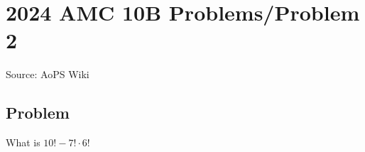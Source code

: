 \documentclass[12pt]{article}
\begin{document}
\section*{{2024 AMC 10B Problems/Problem 2}}
Source: AoPS Wiki

\subsection*{Problem}
What is $10! - 7! \cdot 6!$
\end{document}
